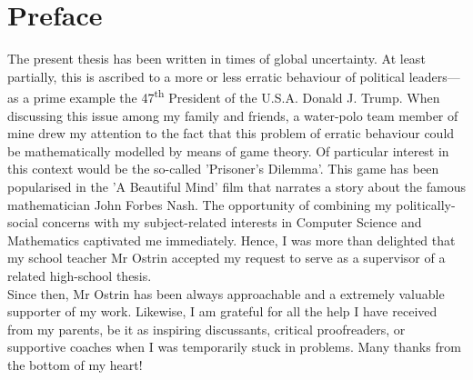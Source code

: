 \documentclass[11pt]{article}
\begin{document}
\section*{Preface}
The present thesis has been written in times of global uncertainty.
At least partially, this is ascribed to a more or less erratic behaviour of political leaders---as a prime example the 47\textsuperscript{th} President of the U.S.A. Donald J. Trump.
When discussing this issue among my family and friends, a water-polo team member of mine drew my attention to the fact that this problem of erratic behaviour could be mathematically modelled by means of game theory.
Of particular interest in this context would be the so-called 'Prisoner's Dilemma'.
This game has been popularised in the 'A Beautiful Mind' film that narrates a story about the famous mathematician John Forbes Nash.
The opportunity of combining my politically-social concerns with my subject-related interests in Computer Science and Mathematics captivated me immediately.
Hence, I was more than delighted that my school teacher Mr Ostrin accepted my request to serve as a supervisor of a related high-school thesis.\\
\indent Since then, Mr Ostrin has been always approachable and a extremely valuable supporter of my work.
Likewise, I am grateful for all the help I have received from my parents, be it as inspiring discussants, critical proofreaders, or supportive coaches when I was temporarily stuck in problems. Many thanks from the bottom of my heart!


\newpage

\tableofcontents
\newpage
\end{document}

